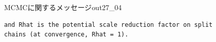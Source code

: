 \begin{Rscreen}{MCMCに関するメッセージ}{out27_04}
	\begin{verbatim}
and Rhat is the potential scale reduction factor on split 
chains (at convergence, Rhat = 1).
\end{verbatim}
\end{Rscreen}
